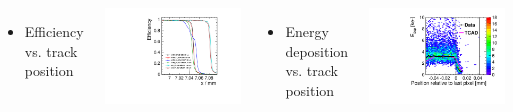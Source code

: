 \begin{frame}
  \begin{columns}[t]
    
    \begin{itemize}
    \item Efficiency vs. track position
    \end{itemize}
    \centering
    \includegraphics[width=\textwidth, page=12]{../figures/TestBeam/edge_bcp.pdf}
    
    \begin{itemize}
    \item Energy deposition vs. track position
    \end{itemize}
    \centering
    \includegraphics[width=\textwidth]{../figures/ActiveEdge/55_GNDGR_Edep_TCAD_data.pdf}
  \end{columns}

\end{frame}

